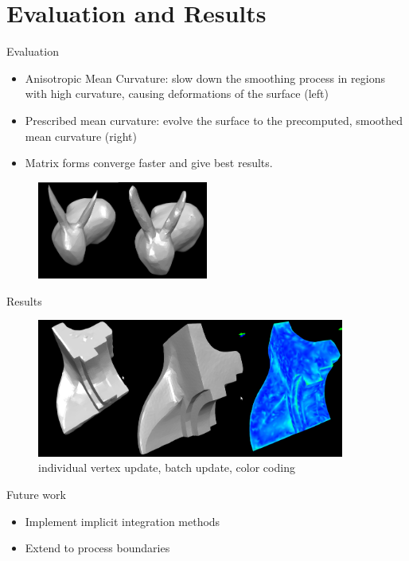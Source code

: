 \documentclass{beamer}
\begin{document}
\section{Evaluation and Results}

\begin{frame}{Evaluation}
\begin{itemize}
\item Anisotropic Mean Curvature: slow down the smoothing process in regions with high curvature, causing deformations of the surface (left)
\item Prescribed mean curvature: evolve the surface to the precomputed, smoothed mean curvature (right)
\item Matrix forms converge faster and give best results.
\end{itemize}
\begin{figure}[htb]
\centering
\includegraphics[width=0.5\textwidth]{amc_pmc.png}
\label{fig:amc_pmc}
\end{figure}
\end{frame}

\begin{frame}{Results}
\begin{figure}[htb]
\centering
\includegraphics[width=0.9\textwidth]{results.png}
\caption{individual vertex update, batch update, color coding}
\label{fig:results}
\end{figure}
\end{frame}

\begin{frame}{Future work}
\begin{itemize}
	\item Implement implicit integration methods
	\item Extend to process boundaries
\end{itemize}
\end{frame}
\end{document}
